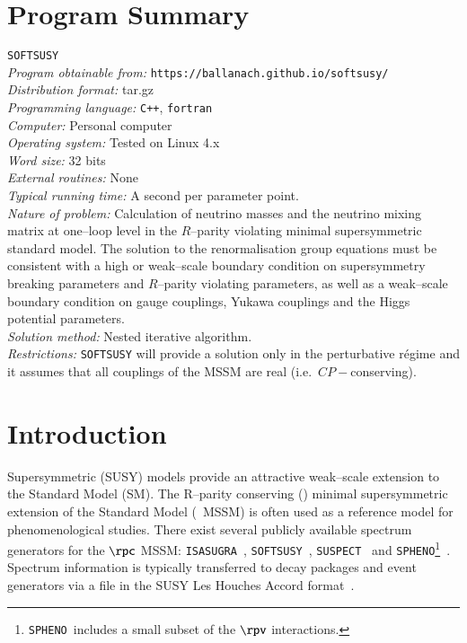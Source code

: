 \documentclass[pdflatex,final,3p,times]{elsarticle}
\def\SOFTSUSY{{\tt SOFTSUSY}}
\def\SUSPECT{{\tt SUSPECT}}
\def\SPHENO{{\tt SPHENO}}
\def\ISASUGRA{{\tt ISASUGRA}}
\begin{document}
\section{Program Summary}
 \SOFTSUSY{}\\
{\em Program obtainable
  from:} {\tt https://ballanach.github.io/softsusy/}\\
{\em Distribution format:}\/ tar.gz\\
{\em Programming language:} {\tt C++}, {\tt fortran}\\
{\em Computer:}\/ Personal computer\\
{\em Operating system:}\/ Tested on Linux 4.x\\
{\em Word size:}\/ 32 bits\\
{\em External routines:}\/ None\\
{\em Typical running time:}\/ A second per parameter point.\\
{\em Nature of problem:}\/ Calculation of neutrino masses and the neutrino
mixing matrix at one--loop level
in the $R$--parity violating minimal supersymmetric standard 
model. The solution to the renormalisation group equations must be consistent
with a high or weak--scale boundary condition on supersymmetry breaking
parameters and $R$--parity violating parameters, as well as a weak--scale boundary condition
on gauge couplings, Yukawa couplings and the Higgs potential parameters.\\
{\em Solution method:}\/ Nested iterative algorithm. \\
{\em Restrictions:} {\SOFTSUSY} will provide a solution only in the
perturbative r\'{e}gime and it assumes that all couplings of the MSSM are real
(i.e.\ $CP-$conserving). 

\newpage

\section{Introduction}

Supersymmetric (SUSY) models provide an attractive weak--scale
extension to the Standard Model (SM).  The R--parity
conserving (\rpc) minimal supersymmetric extension of the Standard Model
(\rpc~MSSM) is often used as a reference model for phenomenological
studies.  There exist several publicly available spectrum generators
for the $\rpc$ MSSM: \ISASUGRA~\cite{Paige:2003mg},
\SOFTSUSY~\cite{Allanach:2001kg}, \SUSPECT~\cite{Djouadi:2002ze} and
\SPHENO\footnote{\SPHENO~includes a small subset of the $\rpv$ interactions.}~\cite{Porod:2003um}.  Spectrum information is typically
transferred to decay packages and event generators via a file in the
SUSY Les Houches Accord format~\cite{Skands:2003cj,Allanach:2008qq}.
\end{document}
